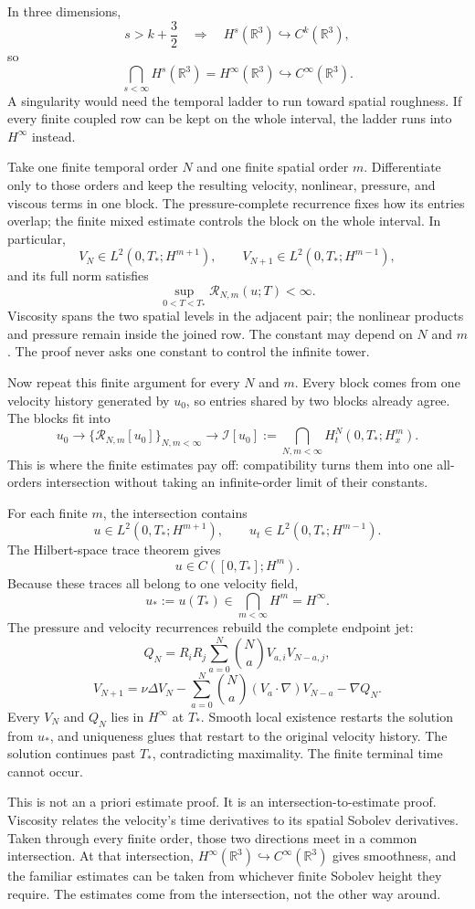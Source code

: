 \documentclass[11pt]{article}
\begin{document}
In three dimensions,
\[
s>k+\frac32
\quad\Longrightarrow\quad
H^s(\mathbb R^3)\hookrightarrow C^k(\mathbb R^3),
\]
so
\[
\bigcap_{s<\infty}H^s(\mathbb R^3)
=H^\infty(\mathbb R^3)
\hookrightarrow C^\infty(\mathbb R^3).
\]
A singularity would need the temporal ladder to run toward spatial roughness. If every finite coupled row can be kept on the whole interval, the ladder runs into \(H^\infty\) instead.

Take one finite temporal order \(N\) and one finite spatial order \(m\). Differentiate only to those orders and keep the resulting velocity, nonlinear, pressure, and viscous terms in one block. The pressure-complete recurrence fixes how its entries overlap; the finite mixed estimate controls the block on the whole interval. In particular,
\[
V_N\in L^2(0,T_*;H^{m+1}),
\qquad
V_{N+1}\in L^2(0,T_*;H^{m-1}),
\]
and its full norm satisfies
\[
\sup_{0<T<T_*}\mathcal R_{N,m}(u;T)<\infty.
\]
Viscosity spans the two spatial levels in the adjacent pair; the nonlinear products and pressure remain inside the joined row. The constant may depend on \(N\) and \(m\). The proof never asks one constant to control the infinite tower.

Now repeat this finite argument for every \(N\) and \(m\). Every block comes from one velocity history generated by \(u_0\), so entries shared by two blocks already agree. The blocks fit into
\[
u_0
\longrightarrow
\{\mathcal R_{N,m}[u_0]\}_{N,m<\infty}
\longrightarrow
\mathcal I[u_0]
:=
\bigcap_{N,m<\infty}H_t^N(0,T_*;H_x^m).
\]
This is where the finite estimates pay off: compatibility turns them into one all-orders intersection without taking an infinite-order limit of their constants.

For each finite \(m\), the intersection contains
\[
u\in L^2(0,T_*;H^{m+1}),
\qquad
u_t\in L^2(0,T_*;H^{m-1}).
\]
The Hilbert-space trace theorem gives
\[
u\in C([0,T_*];H^m).
\]
Because these traces all belong to one velocity field,
\[
u_*:=u(T_*)\in\bigcap_{m<\infty}H^m=H^\infty.
\]
The pressure and velocity recurrences rebuild the complete endpoint jet:
\[
Q_N
=R_iR_j\sum_{a=0}^{N}\binom NaV_{a,i}V_{N-a,j},
\]
\[
V_{N+1}
=\nu\Delta V_N
-\sum_{a=0}^{N}\binom Na(V_a\cdot\nabla)V_{N-a}
-\nabla Q_N.
\]
Every \(V_N\) and \(Q_N\) lies in \(H^\infty\) at \(T_*\). Smooth local existence restarts the solution from \(u_*\), and uniqueness glues that restart to the original velocity history. The solution continues past \(T_*\), contradicting maximality. The finite terminal time cannot occur.

This is not an a priori estimate proof. It is an intersection-to-estimate proof. Viscosity relates the velocity's time derivatives to its spatial Sobolev derivatives. Taken through every finite order, those two directions meet in a common intersection. At that intersection, \(H^\infty(\mathbb R^3)\hookrightarrow C^\infty(\mathbb R^3)\) gives smoothness, and the familiar estimates can be taken from whichever finite Sobolev height they require. The estimates come from the intersection, not the other way around.
\end{document}
